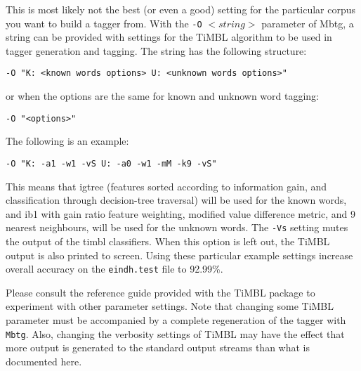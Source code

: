 \documentclass{report}
\begin{document}
This is most likely not the best (or even a good) setting for the
particular corpus you want to build a tagger from.  With the {\tt -O} 
$<string>$ parameter of Mbtg, a string can be provided with
settings for the TiMBL algorithm to be used in tagger generation
and tagging. The string has the following structure:

{\small
\begin{verbatim}
-O "K: <known words options> U: <unknown words options>" 
\end{verbatim}
}

or when the options are the same for known and unknown word tagging: 

{\small
\begin{verbatim}
-O "<options>"
\end{verbatim}
}

The following is an example: 

{\small
\begin{verbatim}
-O "K: -a1 -w1 -vS U: -a0 -w1 -mM -k9 -vS" 
\end{verbatim}
}

This means that {\sc igtree} (features sorted according to information
gain, and classification through decision-tree traversal) will be used
for the known words, and {\sc ib1} with gain ratio feature weighting,
modified value difference metric, and 9 nearest neighbours, will be
used for the unknown words. The {\tt -Vs} setting mutes the output of the {\sc
timbl} classifiers. When this option is left out, the TiMBL
output is also printed to screen. Using these particular example
settings increase overall accuracy on the {\tt eindh.test} file to
92.99\%.

Please consult the reference guide provided with the TiMBL
package to experiment with other parameter settings. Note that
changing some TiMBL parameter must be accompanied by a complete
regeneration of the tagger with {\tt Mbtg}. Also, changing the
verbosity settings of TiMBL may have the effect that more output
is generated to the standard output streams than what is documented here.

\clearpage



\end{document}
